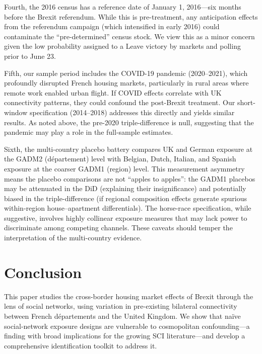 \documentclass[12pt]{article}
\begin{document}
Fourth, the 2016 census has a reference date of January 1, 2016---six months before the Brexit referendum. While this is pre-treatment, any anticipation effects from the referendum campaign (which intensified in early 2016) could contaminate the ``pre-determined'' census stock. We view this as a minor concern given the low probability assigned to a Leave victory by markets and polling prior to June 23.

Fifth, our sample period includes the COVID-19 pandemic (2020--2021), which profoundly disrupted French housing markets, particularly in rural areas where remote work enabled urban flight. If COVID effects correlate with UK connectivity patterns, they could confound the post-Brexit treatment. Our short-window specification (2014--2018) addresses this directly and yields similar results. As noted above, the pre-2020 triple-difference is null, suggesting that the pandemic may play a role in the full-sample estimates.

Sixth, the multi-country placebo battery compares UK and German exposure at the GADM2 (d\'epartement) level with Belgian, Dutch, Italian, and Spanish exposure at the coarser GADM1 (region) level. This measurement asymmetry means the placebo comparisons are not ``apples to apples'': the GADM1 placebos may be attenuated in the DiD (explaining their insignificance) and potentially biased in the triple-difference (if regional composition effects generate spurious within-region house--apartment differentials). The horse-race specification, while suggestive, involves highly collinear exposure measures that may lack power to discriminate among competing channels. These caveats should temper the interpretation of the multi-country evidence.


\section{Conclusion}\label{sec:conclusion}

This paper studies the cross-border housing market effects of Brexit through the lens of social networks, using variation in pre-existing bilateral connectivity between French d\'epartements and the United Kingdom. We show that na\"ive social-network exposure designs are vulnerable to cosmopolitan confounding---a finding with broad implications for the growing SCI literature---and develop a comprehensive identification toolkit to address it.
\end{document}
